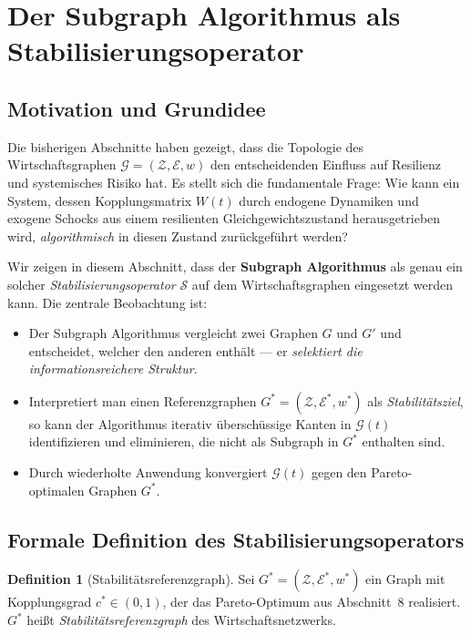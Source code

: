 \documentclass[a4paper, 12pt, twoside, openright]{report}
\theoremstyle{definition}
\newtheorem{definition}[theorem]{Definition}
\theoremstyle{definition}
\begin{document}
\section{Der Subgraph Algorithmus als Stabilisierungsoperator}
\label{sec:stabop}

\subsection{Motivation und Grundidee}

Die bisherigen Abschnitte haben gezeigt, dass die Topologie des Wirtschaftsgraphen
$\mathcal{G} = (\mathcal{Z}, \mathcal{E}, w)$ den entscheidenden Einfluss auf
Resilienz und systemisches Risiko hat. Es stellt sich die fundamentale Frage: Wie kann
ein System, dessen Kopplungsmatrix $W(t)$ durch endogene Dynamiken und exogene Schocks
aus einem resilienten Gleichgewichtszustand herausgetrieben wird, \emph{algorithmisch}
in diesen Zustand zurückgeführt werden?

Wir zeigen in diesem Abschnitt, dass der \textbf{Subgraph Algorithmus} \citep{epp2026subgraph}
als genau ein solcher \emph{Stabilisierungsoperator} $\mathcal{S}$ auf dem Wirtschaftsgraphen
eingesetzt werden kann. Die zentrale Beobachtung ist:

\begin{itemize}
    \item Der Subgraph Algorithmus vergleicht zwei Graphen $G$ und $G'$ und entscheidet,
          welcher den anderen enthält --- er \emph{selektiert die informationsreichere Struktur}.
    \item Interpretiert man einen Referenzgraphen $G^* = (\mathcal{Z}, \mathcal{E}^*, w^*)$
          als \emph{Stabilitätsziel}, so kann der Algorithmus iterativ überschüssige Kanten
          in $\mathcal{G}(t)$ identifizieren und eliminieren, die nicht als Subgraph in $G^*$
          enthalten sind.
    \item Durch wiederholte Anwendung konvergiert $\mathcal{G}(t)$ gegen den
          Pareto-optimalen Graphen $G^*$.
\end{itemize}

\subsection{Formale Definition des Stabilisierungsoperators}

\begin{definition}[Stabilitätsreferenzgraph]
\label{def:refgraph}
    Sei $G^* = (\mathcal{Z}, \mathcal{E}^*, w^*)$ ein Graph mit Kopplungsgrad
    $c^* \in (0,1)$, der das Pareto-Optimum aus Abschnitt~8 realisiert. $G^*$
    heißt \emph{Stabilitätsreferenzgraph} des Wirtschaftsnetzwerks.
\end{definition}
\end{document}
